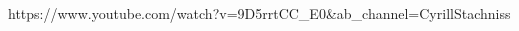 \documentclass[conference]{IEEEtran}
\begin{document}
%










%
%
%
\begin{thebibliography}{1}
https://www.youtube.com/watch?v=9D5rrtCC\_E0&ab\_channel=CyrillStachniss

\end{thebibliography}




\end{document}
